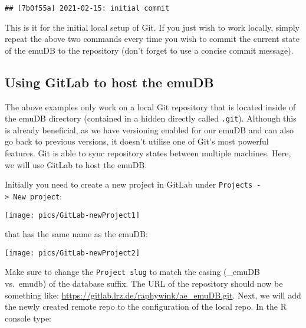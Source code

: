\documentclass[
]{book}
\newenvironment{Shaded}{\begin{snugshade}}{\end{snugshade}}
\newcommand{\AttributeTok}[1]{\textcolor[rgb]{0.77,0.63,0.00}{#1}}
\newcommand{\FunctionTok}[1]{\textcolor[rgb]{0.00,0.00,0.00}{#1}}
\newcommand{\NormalTok}[1]{#1}
\newcommand{\SpecialCharTok}[1]{\textcolor[rgb]{0.00,0.00,0.00}{#1}}
\newcommand{\StringTok}[1]{\textcolor[rgb]{0.31,0.60,0.02}{#1}}
\begin{document}
\begin{verbatim}
## [7b0f55a] 2021-02-15: initial commit
\end{verbatim}

This is it for the initial local setup of Git. If you just wish to work locally, simply repeat the above two commands every time you wish to commit the current state of the emuDB to the repository (don't forget to use a concise commit message).

\hypertarget{using-gitlab-to-host-the-emudb}{%
\subsection{Using GitLab to host the emuDB}\label{using-gitlab-to-host-the-emudb}}

The above examples only work on a local Git repository that is located inside of the emuDB directory (contained in a hidden directly called \texttt{.git}). Although this is already beneficial, as we have versioning enabled for our emuDB and can also go back to previous versions, it doesn't utilise one of Git's most powerful features. Git is able to sync repository states between multiple machines. Here, we will use GitLab to host the emuDB.

Initially you need to create a new project in GitLab under \texttt{Projects\ -\textgreater{}\ New\ project}:

\begin{center}\texttt{[image: pics/GitLab-newProject1]} \end{center}

that has the same name as the emuDB:

\begin{center}\texttt{[image: pics/GitLab-newProject2]} \end{center}

Make sure to change the \texttt{Project\ slug} to match the casing (\_emuDB vs.~emudb) of the database suffix. The URL of the repository should now be something like: \url{https://gitlab.lrz.de/raphywink/ae_emuDB.git}. Next, we will add the newly created remote repo to the configuration of the local repo. In the R console type:

\begin{Shaded}
\end{Shaded}
\end{document}
